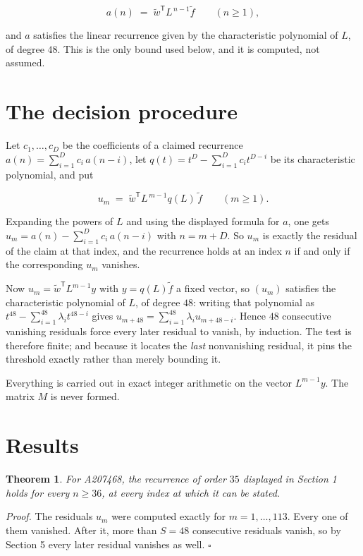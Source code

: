 \documentclass[11pt]{article}
\newtheorem{theorem}{Theorem}
\theoremstyle{definition}
\begin{document}
\[a(n) \;=\; \tilde w^{\mathsf T} L^{\,n-1} \tilde f \qquad (n \ge 1),\]

and $a$ satisfies the linear recurrence given by the characteristic polynomial of $L$, of degree $48$. This is the only bound used below, and it is computed, not assumed.

\section{The decision procedure}

Let $c_1,\dots,c_D$ be the coefficients of a claimed recurrence $a(n) = \sum_{i=1}^{D} c_i\,a(n-i)$, let $q(t) = t^{D} - \sum_{i=1}^{D} c_i t^{D-i}$ be its characteristic polynomial, and put

\[u_m \;=\; \tilde w^{\mathsf T} L^{\,m-1} q(L)\,\tilde f \qquad (m \ge 1).\]

Expanding the powers of $L$ and using the displayed formula for $a$, one gets $u_m = a(n) - \sum_{i=1}^{D} c_i\,a(n-i)$ with $n = m + D$. So $u_m$ is exactly the residual of the claim at that index, and the recurrence holds at an index $n$ if and only if the corresponding $u_m$ vanishes.

Now $u_m = \tilde w^{\mathsf T} L^{m-1} y$ with $y = q(L)\tilde f$ a fixed vector, so $(u_m)$ satisfies the characteristic polynomial of $L$, of degree $48$: writing that polynomial as $t^{48} - \sum_{i=1}^{48} \lambda_i t^{48-i}$ gives $u_{m+48} = \sum_{i=1}^{48} \lambda_i u_{m+48-i}$. Hence $48$ consecutive vanishing residuals force every later residual to vanish, by induction. The test is therefore finite; and because it locates the {\itshape last} nonvanishing residual, it pins the threshold exactly rather than merely bounding it.

Everything is carried out in exact integer arithmetic on the vector $L^{m-1}y$. The matrix $M$ is never formed.

\section{Results}

\begin{theorem} For A207468, the recurrence of order $35$ displayed in Section 1 holds for every $n \ge 36$, at every index at which it can be stated.\end{theorem}

{\itshape Proof.} The residuals $u_m$ were computed exactly for $m = 1,\dots,113$. Every one of them vanished. After it, more than $S = 48$ consecutive residuals vanish, so by Section 5 every later residual vanishes as well. $\square$
\end{document}
